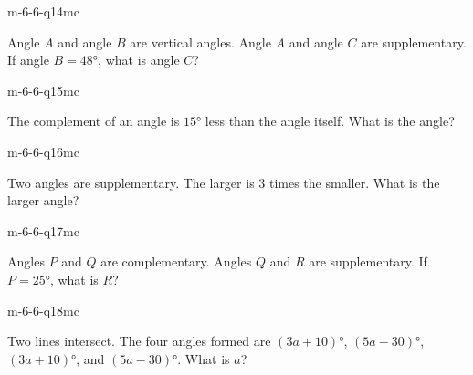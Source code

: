\begin{practiceQuestion}{m-6-6-q14}{mc}
\begin{questionText}
Angle $A$ and angle $B$ are vertical angles. Angle $A$ and angle $C$ are supplementary. If angle $B = 48°$, what is angle $C$?
\end{questionText}
\end{practiceQuestion}

\begin{practiceQuestion}{m-6-6-q15}{mc}
\begin{questionText}
The complement of an angle is $15°$ less than the angle itself. What is the angle?
\end{questionText}
\end{practiceQuestion}

\begin{practiceQuestion}{m-6-6-q16}{mc}
\begin{questionText}
Two angles are supplementary. The larger is $3$ times the smaller. What is the larger angle?
\end{questionText}
\end{practiceQuestion}

\begin{practiceQuestion}{m-6-6-q17}{mc}
\begin{questionText}
Angles $P$ and $Q$ are complementary. Angles $Q$ and $R$ are supplementary. If $P = 25°$, what is $R$?
\end{questionText}
\end{practiceQuestion}

\begin{practiceQuestion}{m-6-6-q18}{mc}
\begin{questionText}
Two lines intersect. The four angles formed are $(3a + 10)°$, $(5a - 30)°$, $(3a + 10)°$, and $(5a - 30)°$. What is $a$?
\end{questionText}
\end{practiceQuestion}

